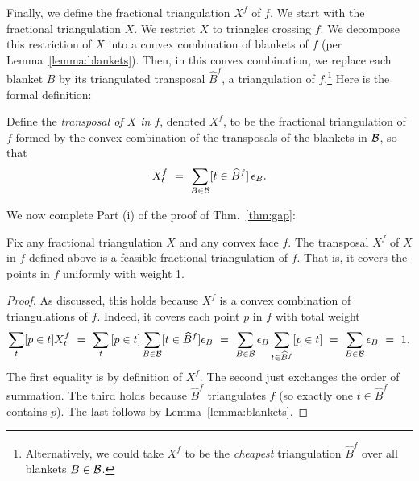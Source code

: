 \documentclass[final]{siamltex}
\newcommand{\transposal}[2]{{#1}^{#2}}
\newcommand{\triangulated}[2]{{\widehat{#1}}^{#2}}
\newcommand{\blanket}{B} \newcommand{\blanketSet}{{\cal B}} \newcommand{\convPart}{\text{\sc cp}}
\newcommand{\face}{f}
\newcommand{\tri}{t}  \newcommand{\vertex}{v}
\newcommand{\fracTriang}{X}
\begin{document}
Finally, we define the fractional triangulation $\transposal{\fracTriang}{\face}$ of $\face$.
We start with the fractional triangulation $\fracTriang$.
We restrict $\fracTriang$ to triangles crossing $\face$.
We decompose this restriction of $\fracTriang$
into a convex combination of blankets of $\face$
(per Lemma~\ref{lemma:blankets}).
Then, in this convex combination, we replace each blanket $\blanket$
by its triangulated transposal $\triangulated{\blanket}{\face}$, a triangulation of $\face$.\footnote
{Alternatively, we could take $\transposal{\fracTriang}{\face}$ to be
the {\em cheapest} triangulation $\triangulated{\blanket}{\face}$ 
over all blankets $\blanket\in\blanketSet$.}
Here is the formal definition:
\begin{definition}
  \label{def:triangulation_transposal}
  Define the {\em transposal of $\fracTriang$ in $\face$},
  denoted $\transposal{\fracTriang}{\face}$, 
  to be the fractional triangulation of $\face$
  formed by the convex combination 
  of the transposals of the blankets in $\blanketSet$, so that
  \[\transposal{\fracTriang}{\face}_{\tri} 
  ~=~ \sum_{\blanket\in\blanketSet} [\tri \in \triangulated{\blanket}{\face}] \,\epsilon_{\blanket}.
  \]
\end{definition}

We now complete Part (i) of the proof of Thm.~\ref{thm:gap}:
\begin{lemma}\label{thm:feasibility}
  Fix any fractional triangulation $\fracTriang$ and any convex face $\face$.
  The transposal $\transposal{\fracTriang}{\face}$ of $\fracTriang$ in $\face$ 
  defined above
  is a feasible fractional triangulation of $\face$.
  That is, it covers the points in $\face$ uniformly with weight 1.
\end{lemma}

\begin{proof}
As discussed, this holds because $\transposal{\fracTriang}{\face}$ is a convex combination
of triangulations of $\face$.
Indeed, it covers each point $p$ in $\face$ with total weight
\[
\sum_{\tri} [p\in t]\transposal{\fracTriang}{\face}_\tri
~=~
\sum_{\tri} \,[p\in t]
\sum_{\blanket\in\blanketSet} [\tri \in \triangulated{\blanket}{\face}] \epsilon_{\blanket}
~=~ \sum_{\blanket\in\blanketSet}\epsilon_{\blanket} \sum_{\tri\in \triangulated{\blanket}{\face}} [p\in \tri]
~=~ \sum_{\blanket\in\blanketSet}\epsilon_{\blanket}
~=~ 1.
\]
The first equality is by definition of $\transposal{\fracTriang}{\face}$.
The second just exchanges the order of summation.
The third holds because $\triangulated{\blanket}{\face}$ triangulates $\face$
(so exactly one $t\in\triangulated{\blanket}{\face}$ contains $p$).
The last follows by Lemma~\ref{lemma:blankets}.
\end{proof}
\end{document}

